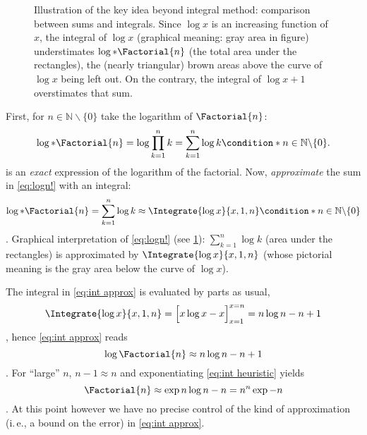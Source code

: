 \documentclass[onecolumn,a4paper,11pt]{article}
\providecommand{\ie}{i.\,e.}
\newcommand{\numberset}{\mathbb}
\providecommand{\N}{\numberset{N}}
\theoremstyle{classicdef}
\theoremstyle{remark}
\begin{document}
\begin{figure}
\centering
{}
\caption{%
   Illustration of the key idea beyond integral method: comparison between sums
   and integrals.  Since $\log{x} $ is an increasing function of $x$, the
   integral of $\log{x}$ (graphical meaning: gray area in figure) understimates
   $\log*{\Factorial{n}}$ (the total area under the rectangles), the (nearly
   triangular) brown areas above the curve of $\log{x}$ being left out. On the
   contrary, the integral of $\log{x+1}$ overstimates that sum.  
   \label{fig:int met}
}
\end{figure}

First, for $n\in\N\backslash\{0\}$ take the logarithm of $\Factorial{n}$:
\begin{dmath}[label={logn!},compact]
   \log*{\Factorial{n}} = \log{\prod_{k=1}^{n} k }= \sum_{k=1}^{n}
   \log{k} \condition*{n\in\N\backslash\{0\}}.
\end{dmath}
  is an \emph{exact} expression of the logarithm of the factorial.  Now, \emph{approximate} the sum in \cref{eq:logn!} with an integral:
\begin{dmath}[label={int approx},compact]
   \log*{\Factorial{n}} = \sum_{k=1}^{n} \log k \approx \Integrate{\log x}{x,1,n}
\condition*{n\in\N\backslash\{0\}}
\end{dmath}.
Graphical interpretation of \cref{eq:logn!} (see \cref{fig:int met}):
$\sum_{k=1}^{n} \log k$ (area under the rectangles) is approximated by
$\Integrate{\log x}{x,1,n}$ (whose pictorial meaning is the gray area below the
curve of $\log x $).

The integral in \cref{eq:int approx} is evaluated 
by parts as usual,  
\begin{dmath*}[compact]
\Integrate{\log x }{x, 1, n}
= \Big[ x\log x -  x\Big]_{x=1}^{x=n} =  n \log n -
n+1
\end{dmath*},
hence \cref{eq:int approx}  reads
\begin{dmath}[label={int heuristic}, compact]
   \log{\Factorial{n}} \approx n \log n - n +1
\end{dmath}.
For ``large'' $n$,  $n-1\approx n$ and 
exponentiating \cref{eq:int heuristic} yields
\begin{dmath}[frame,compact]
   \Factorial{n} \approx \exp{n\log n - n } = n^{n} \exp{-n}  
\end{dmath}.
At this point however we have no precise control of the kind of approximation
(\ie, a bound on the error) in
\cref{eq:int approx}.
\end{document}
